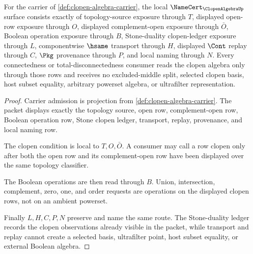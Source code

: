 \begin{theorem}
\label{thm:clopen-algebra-namecert-obligations}
For the carrier of \autoref{def:clopen-algebra-carrier}, the local $\NameCert_{\ClopenAlgebraUp}$ surface consists exactly of topology-source exposure through $T$, displayed open-row exposure through $O$, displayed complement-open exposure through $\bar O$, Boolean operation exposure through $B$, Stone-duality clopen-ledger exposure through $L$, componentwise $\hsame$ transport through $H$, displayed $\Cont$ replay through $C$, $\Pkg$ provenance through $P$, and local naming through $N$. Every connectedness or total-disconnectedness consumer reads the clopen algebra only through those rows and receives no excluded-middle split, selected clopen basis, host subset equality, arbitrary powerset algebra, or ultrafilter representation.
\end{theorem}
\begin{proof}
Carrier admission is projection from \autoref{def:clopen-algebra-carrier}. The packet displays exactly the topology source, open row, complement-open row, Boolean operation row, Stone clopen ledger, transport, replay, provenance, and local naming row.

The clopen condition is local to $T,O,\bar O$. A consumer may call a row clopen only after both the open row and its complement-open row have been displayed over the same topology classifier.

The Boolean operations are then read through $B$. Union, intersection, complement, zero, one, and order requests are operations on the displayed clopen rows, not on an ambient powerset.

Finally $L,H,C,P,N$ preserve and name the same route. The Stone-duality ledger records the clopen observations already visible in the packet, while transport and replay cannot create a selected basis, ultrafilter point, host subset equality, or external Boolean algebra.
\end{proof}


